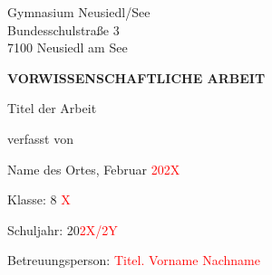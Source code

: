 \thispagestyle{empty}
\phantom{.}

\vspace{22.1mm}

\begin{center}
    Gymnasium Neusiedl/See\\
    \vspace{0.7mm}
    Bundesschulstraße 3\\
\vspace{0.7mm}
7100 Neusiedl am See

\vspace{21mm}

{\fontsize{20}{24}\selectfont \textbf{VORWISSENSCHAFTLICHE ARBEIT}}


\vspace{21.6mm}
Titel der Arbeit
\begin{Large}

    \textcolor{red}{{{{\fontsize{20}{24}\selectfont{Titel der VWA}}}}}

\end{Large}

\vspace{29.1mm}
verfasst von\\

\vspace{5.5mm}
\begin{Large}
\textcolor{red}{{\fontsize{20}{24}\selectfont{Vorname Nachname}}}
\end{Large}
\end{center}
\begin{small}
    

\vspace{29.3mm}
Name des Ortes, Februar \textcolor{red}{202X}

\vspace{0.75mm}
Klasse: 8 \textcolor{red}{X}

\vspace{0.73mm}
Schuljahr: 20\textcolor{red}{2X/2Y}

\vspace{0.73mm}
Betreuungsperson: \textcolor{red}{Titel. Vorname Nachname}
\end{small}
